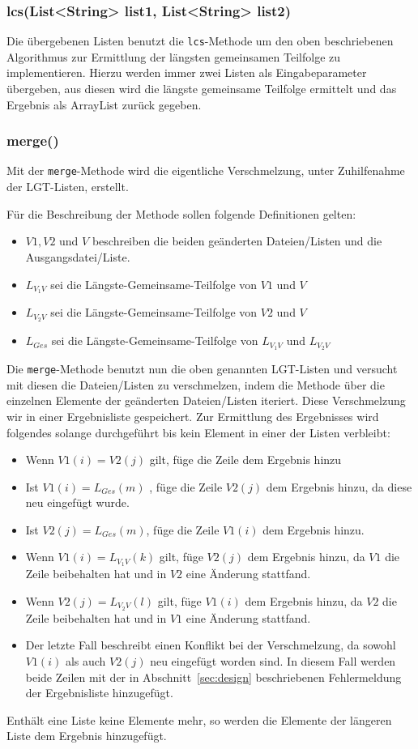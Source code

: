 \documentclass[a4paper,titlepage,12pt]{scrartcl}
\begin{document}
\subsubsection{lcs(List<String> list1, List<String> list2)}
\label{sec:lcs}
Die übergebenen Listen benutzt die \texttt{lcs}-Methode um den oben beschriebenen Algorithmus zur Ermittlung der längsten gemeinsamen Teilfolge zu implementieren.
Hierzu werden immer zwei Listen als Eingabeparameter übergeben, aus diesen wird die längste gemeinsame Teilfolge ermittelt und das Ergebnis als ArrayList zurück gegeben.

\subsubsection{merge()}
\label{sec:merge}
Mit der \texttt{merge}-Methode wird die eigentliche Verschmelzung, unter Zuhilfenahme der LGT-Listen, erstellt.

Für die Beschreibung der Methode sollen folgende Definitionen gelten:
\begin{itemize}
\item $V1 , V2$ und $V$ beschreiben die beiden geänderten Dateien/Listen und die Ausgangsdatei/Liste.
\item $L_{V_{1}V}$ sei die Längste-Gemeinsame-Teilfolge von $V1$ und $V$
\item $L_{V_{2}V}$ sei die Längste-Gemeinsame-Teilfolge von $V2$ und $V$
\item $L_{Ges}$ sei die Längste-Gemeinsame-Teilfolge von $L_{V_{1}V}$ und $L_{V_{2}V}$
\end{itemize}

Die \texttt{merge}-Methode benutzt nun die oben genannten LGT-Listen und versucht mit diesen die Dateien/Listen zu verschmelzen,
indem die Methode über die einzelnen Elemente der geänderten Dateien/Listen iteriert. Diese Verschmelzung wir in einer Ergebnisliste gespeichert.
Zur Ermittlung des Ergebnisses wird folgendes solange durchgeführt bis kein Element in einer der Listen verbleibt:
\begin{itemize}
\item Wenn $V1(i) = V2(j)$ gilt, füge die Zeile dem Ergebnis hinzu
\item Ist $V1(i) = L_{Ges}(m)$ , füge die Zeile $V2(j)$ dem Ergebnis hinzu, da diese neu eingefügt wurde.
\item Ist $V2(j) = L_{Ges}(m)$, füge die Zeile $V1(i)$ dem Ergebnis hinzu.
\item Wenn $V1(i) = L_{V_{1}V}(k)$ gilt, füge $V2(j)$ dem Ergebnis hinzu, da $V1$ die Zeile beibehalten hat und in $V2$ eine Änderung stattfand.
\item Wenn $V2(j) = L_{V_{2}V}(l)$ gilt, füge $V1(i)$ dem Ergebnis hinzu, da $V2$ die Zeile beibehalten hat und in $V1$ eine Änderung stattfand.
\item Der letzte Fall beschreibt einen Konflikt bei der Verschmelzung, da sowohl $V1(i)$ als auch $V2(j)$ neu eingefügt worden sind. In diesem Fall werden beide Zeilen mit der in Abschnitt~\ref{sec:design} beschriebenen Fehlermeldung der Ergebnisliste hinzugefügt.
\end{itemize}
Enthält eine Liste keine Elemente mehr, so werden die Elemente der längeren Liste dem Ergebnis hinzugefügt.
\end{document}

